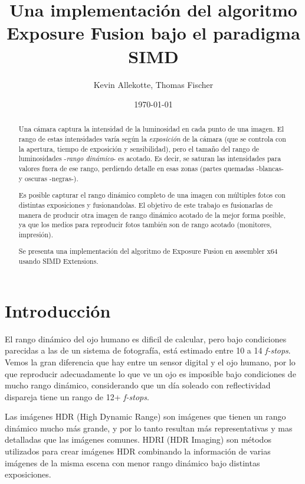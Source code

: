 \documentclass[a4paper,10pt]{article}
\title{Una implementación del algoritmo Exposure Fusion bajo el paradigma SIMD}
\author{Kevin Allekotte, Thomas Fischer}
\date{\today}
\begin{document}
    \maketitle

    \begin{abstract}
        Una cámara captura la intensidad de la luminosidad en cada punto de una imagen. El rango de estas intensidades varía según la \emph{exposición} de la cámara (que se controla con la apertura, tiempo de exposición y sensibilidad), pero el tamaño del rango de luminosidades -\emph{rango dinámico}- es acotado. Es decir, se saturan las intensidades para valores fuera de ese rango, perdiendo detalle en esas zonas (partes quemadas -blancas- y oscuras -negras-).
        
        Es posible capturar el rango dinámico completo de una imagen con múltiples fotos con distintas exposiciones y fusionandolas. El objetivo de este trabajo es fusionarlas de manera de producir otra imagen de rango dinámico acotado de la mejor forma posible, ya que los medios para reproducir fotos también son de rango acotado (monitores, impresión).
        
        Se presenta una implementación del algoritmo de Exposure Fusion \cite{DBLP:conf/pg/MertensKR07} en assembler x64 usando SIMD Extensions.

    \end{abstract}

    \section{Introducción}

        El rango dinámico del ojo humano es dificil de calcular, pero bajo condiciones parecidas a las de un sistema de fotografía, está estimado entre 10 a 14 \emph{f-stops}. Vemos la gran diferencia que hay entre un sensor digital y el ojo humano, por lo que reproducir adecuadamente lo que ve un ojo es imposible bajo condiciones de mucho rango dinámico, considerando que un día soleado con reflectividad dispareja tiene un rango de 12+ \emph{f-stops}.

        Las imágenes HDR (High Dynamic Range) son imágenes que tienen un rango dinámico mucho más grande, y por lo tanto resultan más representativas y mas detalladas que las imágenes comunes. HDRI (HDR Imaging) son métodos utilizados para crear imágenes HDR combinando la información de varias imágenes de la misma escena con menor rango dinámico bajo distintas exposiciones.
\end{document}
